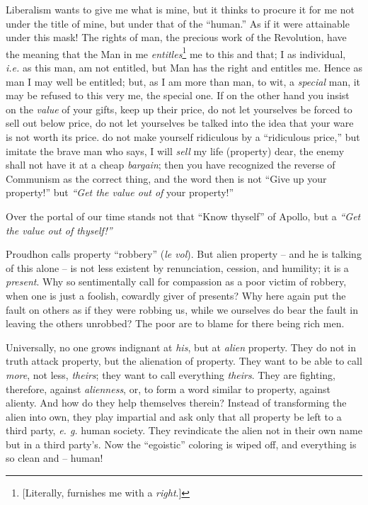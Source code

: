 \documentclass[12pt,a4paper]{book}
\begin{document}
Liberalism wants to give me what is mine, but it thinks to procure it for me 
not under the title of mine, but under that of the ``human.'' As if it were 
attainable under this mask! The rights of man, the precious work of the 
Revolution, have the meaning that the Man in me 
\textit{entitles}\footnote{[Literally, furnishes me with a \textit{right}.]} 
me to this and that; I as individual, \textit{i.e.} as this man, am not 
entitled, but Man has the right and entitles me. Hence as man I may well be 
entitled; but, as I am more than man, to wit, a \textit{special} man, it may 
be refused to this very me, the special one. If on the other hand you insist 
on the \textit{value} of your gifts, keep up their price, do not let 
yourselves be forced to sell out below price, do not let yourselves be talked 
into the idea that your ware is not worth its price. do not make yourself 
ridiculous by a ``ridiculous price,'' but imitate the brave man who says, I 
will \textit{sell} my life (property) dear, the enemy shall not have it at a 
cheap \textit{bargain}; then you have recognized the reverse of Communism as 
the correct thing, and the word then is not ``Give up your property!'' but 
\textit{``Get the value out of} your property!''

Over the portal of our time stands not that ``Know thyself'' of Apollo, but 
a \textit{``Get the value out of thyself!''}

Proudhon calls property ``robbery'' (\textit{le vol}). But alien property -- 
and he is talking of this alone -- is not less existent by renunciation, 
cession, and humility; it is a \textit{present}. Why so sentimentally call for 
compassion as a poor victim of robbery, when one is just a foolish, cowardly 
giver of presents? Why here again put the fault on others as if they were 
robbing us, while we ourselves do bear the fault in leaving the others 
unrobbed? The poor are to blame for there being rich men.

Universally, no one grows indignant at \textit{his}, but at \textit{alien} 
property. They do not in truth attack property, but the alienation of 
property. They want to be able to call \textit{more}, not less, 
\textit{theirs}; they want to call everything \textit{theirs}. They are 
fighting, therefore, against \textit{alienness}, or, to form a word similar to 
property, against alienty. And how do they help themselves therein? Instead of 
transforming the alien into own, they play impartial and ask only that all 
property be left to a third party, \textit{e. g.} human society. They 
revindicate the alien not in their own name but in a third party's. Now the 
``egoistic'' coloring is wiped off, and everything is so clean and -- human!
\end{document}
